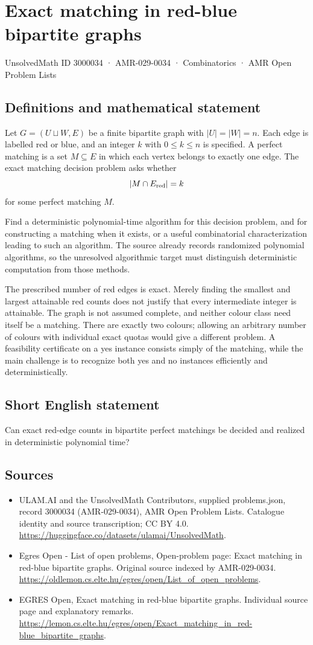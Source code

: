 \documentclass[11pt,a4paper]{article}
\begin{document}
\section*{Exact matching in red-blue bipartite graphs}\label{3000034}
{\small UnsolvedMath ID 3000034 · AMR-029-0034 · Combinatorics · AMR Open Problem Lists}
\subsection{Definitions and mathematical statement}
Let $G=(U\sqcup W,E)$ be a finite bipartite graph with $|U|=|W|=n$.
Each edge is labelled red or blue, and an integer $k$ with
$0\le k\le n$ is specified. A perfect matching is a set $M\subseteq E$
in which each vertex belongs to exactly one edge. The exact matching
decision problem asks whether
\[
                        |M\cap E_{\rm red}|=k
\]
for some perfect matching $M$.

Find a deterministic polynomial-time algorithm for this decision problem,
and for constructing a matching when it exists, or a useful combinatorial
characterization leading to such an algorithm. The source already
records randomized polynomial algorithms, so the unresolved algorithmic
target must distinguish deterministic computation from those methods.

The prescribed number of red edges is exact. Merely finding the smallest
and largest attainable red counts does not justify that every intermediate
integer is attainable. The graph is not assumed complete, and neither
colour class need itself be a matching. There are exactly two colours;
allowing an arbitrary number of colours with individual exact quotas
would give a different problem. A feasibility certificate on a yes
instance consists simply of the matching, while the main challenge is
to recognize both yes and no instances efficiently and deterministically.
\subsection{Short English statement}
Can exact red-edge counts in bipartite perfect matchings be
decided and realized in deterministic polynomial time?
\subsection{Sources}
\begin{itemize}
\item[S1] ULAM.AI and the UnsolvedMath Contributors, supplied problems.json, record 3000034 (AMR-029-0034), AMR Open Problem Lists. Catalogue identity and source transcription; CC BY 4.0.
\url{https://huggingface.co/datasets/ulamai/UnsolvedMath}.
\item[S2] Egres Open - List of open problems, Open-problem page: Exact matching in red-blue bipartite graphs. Original source indexed by AMR-029-0034.
\url{https://oldlemon.cs.elte.hu/egres/open/List_of_open_problems}.
\item[S3] EGRES Open, Exact matching in red-blue bipartite graphs. Individual source page and explanatory remarks.
\url{https://lemon.cs.elte.hu/egres/open/Exact_matching_in_red-blue_bipartite_graphs}.
\end{itemize}
\end{document}
